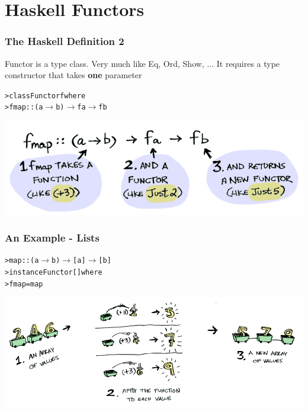 \documentclass[12pt, xcolor=table]{beamer}
\begin{document}
\section{Haskell Functors}
\begin{frame}
    \frametitle{The Haskell Definition 2}
    Functor is a type class. Very much like Eq, Ord, Show, ...
    It requires a type constructor that takes \textbf{one} parameter

    \begin{alltt}
        > class  Functor    f   where \\
        >       fmap         ::   (a $\to$ b) $\to$ f a $\to$ f b
    \end{alltt}
    \begin{center}
        \includegraphics[scale=0.4]{figures/fmapdef.png}
    \end{center}
\end{frame}

\begin{frame}
    \frametitle{An Example - Lists}

    \begin{alltt}
        > map :: (a $\to$ b) $\to$ [a] $\to$ [b] \\
        > instance Functor [] where \\
        >   fmap = map
    \end{alltt}

    \begin{center}
        \includegraphics[scale=0.3]{figures/fmapList.png}
    \end{center}
\end{frame}
\end{document}

